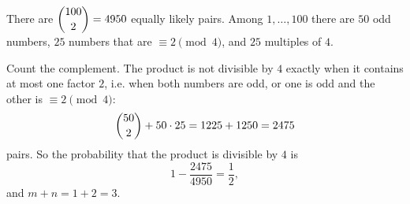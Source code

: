 There are $\dbinom{100}{2}=4950$ equally likely pairs. Among $1,\dots,100$ there are $50$ odd numbers, $25$ numbers that are $\equiv2\pmod4$, and $25$ multiples of $4$.

Count the complement. The product is not divisible by $4$ exactly when it contains at most one factor $2$, i.e. when both numbers are odd, or one is odd and the other is $\equiv2\pmod4$:
\[\dbinom{50}{2}+50\cdot25=1225+1250=2475\]
pairs. So the probability that the product is divisible by $4$ is
\[1-\dfrac{2475}{4950}=\dfrac12,\]
and $m+n=1+2=\boxed{3}$.
